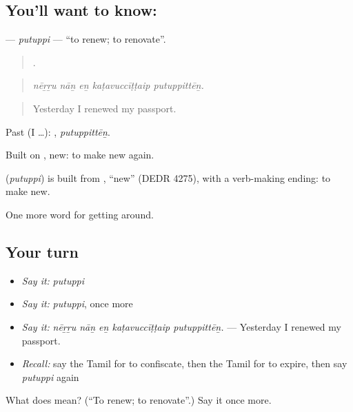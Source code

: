 \subsection*{You'll want to know: }
\textbf{} — \emph{putuppi} — \textquotedblleft{}to renew; to renovate\textquotedblright{}.

\begin{quote}
    .
\end{quote}

\begin{quote}
\emph{nēṟṟu nāṉ eṉ kaṭavuccīṭṭaip putuppittēṉ.}
\end{quote}

\begin{quote}
Yesterday I renewed my passport.
\end{quote}

Past (I …): , \emph{putuppittēṉ}.

Built on , new: to make new again.

\begin{cousinweb}
\textbf{} (\emph{putuppi}) is built from , \textquotedblleft{}new\textquotedblright{} (DEDR 4275), with a verb-making ending: to make new.
\end{cousinweb}

\begin{grammarlens}[title={What you've built}]
One more word for getting around.
\end{grammarlens}

\subsection*{Your turn}
\begin{itemize}
\raggedright
  \item \emph{Say it:} \emph{putuppi}
  \item \emph{Say it:} \emph{putuppi}, once more
  \item \emph{Say it:} \emph{nēṟṟu nāṉ eṉ kaṭavuccīṭṭaip putuppittēṉ.} — Yesterday I renewed my passport.
  \item \emph{Recall:} say the Tamil for to confiscate, then the Tamil for to expire, then say \emph{putuppi} again
\end{itemize}

\begin{tcolorbox}[breakable,colback=teal!4,colframe=teal!35!black,title={Before you move on}]
What does  mean? (\textquotedblleft{}To renew; to renovate\textquotedblright{}.) Say it once more.
\end{tcolorbox}
